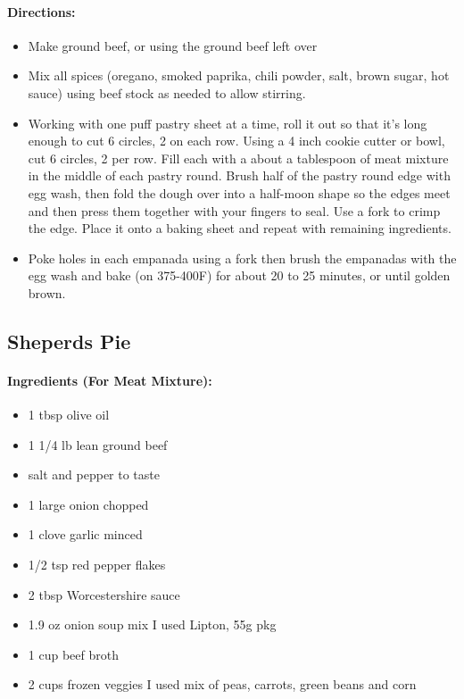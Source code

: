 \documentclass{article}
\begin{document}
\paragraph{Directions:}
\begin{itemize}
  \item Make ground beef, or using the ground beef left over
  \item Mix all spices (oregano, smoked paprika, chili powder, salt, brown sugar, hot sauce) using beef
stock as needed to allow stirring.
  \item Working with one puff pastry sheet at a time, roll it out so that it’s long enough to cut 6 circles, 2 on each
row. Using a 4 inch cookie cutter or bowl, cut 6 circles, 2 per row. Fill each with a about a tablespoon
of meat mixture in the middle of each pastry round. Brush half of the pastry round edge with egg wash,
then fold the dough over into a half-moon shape so the edges meet and then press them together with
your fingers to seal. Use a fork to crimp the edge. Place it onto a baking sheet and repeat with remaining
ingredients.
  \item Poke holes in each empanada using a fork then brush the empanadas with the egg wash and bake (on 375-400F) for about 20 to 25 minutes, or until golden brown.
\end{itemize}


\subsection{Sheperds Pie}
\paragraph{Ingredients (For Meat Mixture):}
\begin{itemize}
  \item 1 tbsp olive oil
  \item 1 1/4 lb lean ground beef
  \item salt and pepper to taste
  \item 1 large onion chopped
  \item 1 clove garlic minced
  \item 1/2 tsp red pepper flakes
  \item 2 tbsp Worcestershire sauce
  \item 1.9 oz onion soup mix I used Lipton, 55g pkg
  \item 1 cup beef broth
  \item 2 cups frozen veggies I used mix of peas, carrots, green beans and corn
\end{itemize}
\end{document}
